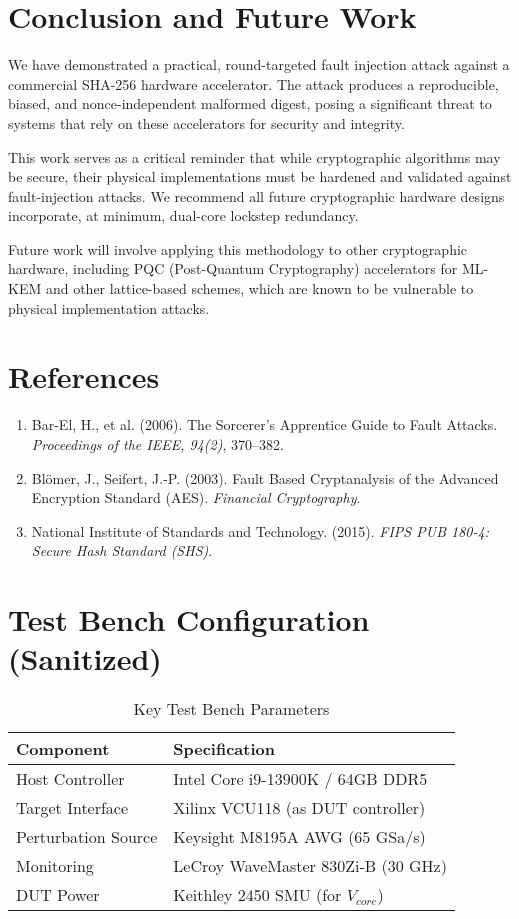 \documentclass[11pt, a4paper]{article}
\begin{document}
\section{Conclusion and Future Work}
We have demonstrated a practical, round-targeted fault injection attack against a commercial SHA-256 hardware accelerator. The attack produces a reproducible, biased, and nonce-independent malformed digest, posing a significant threat to systems that rely on these accelerators for security and integrity.

This work serves as a critical reminder that while cryptographic algorithms may be secure, their physical implementations must be hardened and validated against fault-injection attacks. We recommend all future cryptographic hardware designs incorporate, at minimum, dual-core lockstep redundancy.

Future work will involve applying this methodology to other cryptographic hardware, including PQC (Post-Quantum Cryptography) accelerators for ML-KEM and other lattice-based schemes, which are known to be vulnerable to physical implementation attacks.

\section*{References}
\begin{enumerate}
    \item Bar-El, H., et al. (2006). The Sorcerer's Apprentice Guide to Fault Attacks. \textit{Proceedings of the IEEE, 94(2)}, 370--382.
    \item Bl\"omer, J., Seifert, J.-P. (2003). Fault Based Cryptanalysis of the Advanced Encryption Standard (AES). \textit{Financial Cryptography}.
    \item National Institute of Standards and Technology. (2015). \textit{FIPS PUB 180-4: Secure Hash Standard (SHS)}.
\end{enumerate}

\appendix
\section{Test Bench Configuration (Sanitized)}\label{sec:testbench}
\begin{table}[h]
\centering
\caption{Key Test Bench Parameters}
\label{tab:testbench}
\begin{tabular}{@{}ll@{}}
\toprule
\textbf{Component} & \textbf{Specification} \\ \midrule
Host Controller & Intel Core i9-13900K / 64GB DDR5 \\
Target Interface & Xilinx VCU118 (as DUT controller) \\
Perturbation Source & Keysight M8195A AWG (65 GSa/s) \\
Monitoring & LeCroy WaveMaster 830Zi-B (30 GHz) \\
DUT Power & Keithley 2450 SMU (for $V_{core}$) \\\bottomrule
\end{tabular}
\end{table}
\end{document}
